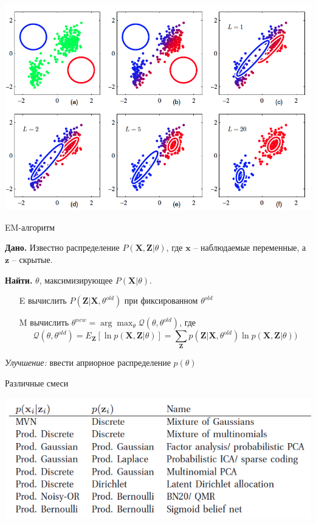 \documentclass[10pt]{beamer}
\begin{document}
\begin{frame}{}

\begin{center}
\includegraphics[scale=0.35]{images/gauss.png}
\end{center}

\end{frame}

\begin{frame}{EM-алгоритм}

{\bf Дано.} Известно распределение $P(\mathbf{X}, \mathbf{Z} | \theta)$, где $\mathbf{x}$ -- наблюдаемые переменные, а $\mathbf{z}$ -- скрытые. 

{\bf Найти.} $\theta$,  максимизирующее $P(\mathbf{X} | \theta)$.

\vspace{1em}
\begin{itemize}
\item[E] вычислить $P(\mathbf{Z} | \mathbf{X}, \theta^{old})$ при фиксированном $\theta^{old}$
\item[M] вычислить $\theta^{new} = \arg \max_{\theta} \mathcal{Q} (\theta, \theta^{old})$, где
\[
\mathcal{Q} (\theta, \theta^{old}) = E_\mathbf{Z}[\ln p(\mathbf{X}, \mathbf{Z} | \theta)] = \sum_{\mathbf{Z}} p(\mathbf{Z} | \mathbf{X}, \theta^{old}) \ln p(\mathbf{X}, \mathbf{Z} | \theta))
\]
\end{itemize}
{\it Улучшение:} ввести априорное распределение $p(\theta)$

\end{frame}

\begin{frame}{Различные смеси}

\begin{center}
\includegraphics[scale=0.4]{images/mixtures.png}
\end{center}

\end{frame}
\end{document}
